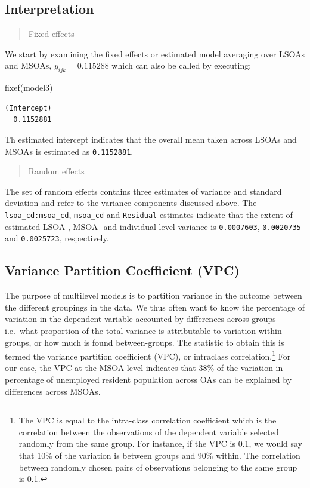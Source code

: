 \documentclass[
  letterpaper,
  DIV=11,
  numbers=noendperiod,
  oneside]{scrreprt}
\newenvironment{Shaded}{\begin{snugshade}}{\end{snugshade}}
\newcommand{\FunctionTok}[1]{\textcolor[rgb]{0.28,0.35,0.67}{#1}}
\newcommand{\NormalTok}[1]{\textcolor[rgb]{0.00,0.23,0.31}{#1}}
\begin{document}
\subsection{Interpretation}\label{interpretation}

\begin{quote}
Fixed effects
\end{quote}

We start by examining the fixed effects or estimated model averaging
over LSOAs and MSOAs, \(y_{ijk} = 0.115288\) which can also be called by
executing:

\begin{Shaded}
\begin{Highlighting}[]
\FunctionTok{fixef}\NormalTok{(model3)}
\end{Highlighting}
\end{Shaded}

\begin{verbatim}
(Intercept) 
  0.1152881 
\end{verbatim}

Th estimated intercept indicates that the overall mean taken across
LSOAs and MSOAs is estimated as \texttt{0.1152881}.

\begin{quote}
Random effects
\end{quote}

The set of random effects contains three estimates of variance and
standard deviation and refer to the variance components discussed above.
The \texttt{lsoa\_cd:msoa\_cd}, \texttt{msoa\_cd} and \texttt{Residual}
estimates indicate that the extent of estimated LSOA-, MSOA- and
individual-level variance is \texttt{0.0007603}, \texttt{0.0020735} and
\texttt{0.0025723}, respectively.

\subsection{Variance Partition Coefficient
(VPC)}\label{variance-partition-coefficient-vpc}

The purpose of multilevel models is to partition variance in the outcome
between the different groupings in the data. We thus often want to know
the percentage of variation in the dependent variable accounted by
differences across groups i.e.~what proportion of the total variance is
attributable to variation within-groups, or how much is found
between-groups. The statistic to obtain this is termed the variance
partition coefficient (VPC), or intraclass correlation.\footnote{The VPC
  is equal to the intra-class correlation coefficient which is the
  correlation between the observations of the dependent variable
  selected randomly from the same group. For instance, if the VPC is
  0.1, we would say that 10\% of the variation is between groups and
  90\% within. The correlation between randomly chosen pairs of
  observations belonging to the same group is 0.1.} For our case, the
VPC at the MSOA level indicates that 38\% of the variation in percentage
of unemployed resident population across OAs can be explained by
differences across MSOAs.
\end{document}
